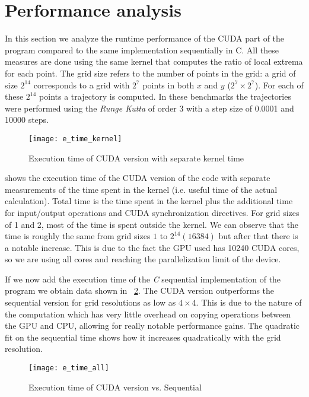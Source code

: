 
\section{Performance analysis}
\label{sec:performance}


In this section we analyze the runtime performance of the CUDA part of
the program compared to the same implementation sequentially in C. All
these measures are done using the same kernel that computes the ratio
of local extrema for each point. The grid size refers to the number of
points in the grid: a grid of size $2^14$ corresponds to a
grid with $2^7$ points in both $x$ and $y$ ($2^7 \times 2^7$). For each of these
$2^14$ points a trajectory is computed. In these benchmarks the trajectories were
performed using the \emph{Runge Kutta} of order 3 with a step size of 0.0001 and
10000 steps.


\begin{figure}[H]
    \centering
    \texttt{[image: e\_time\_kernel]}
    \caption{Execution time of CUDA version with separate kernel time
    }%
    \label{fig:time_overhead}
\end{figure}

 shows the execution time of the CUDA version of the code with separate measurements of the time spent in the kernel (i.e. useful time of the actual calculation). Total time is the time spent in the kernel plus the additional time for input/output operations and CUDA synchronization directives. For grid sizes of 1 and 2, most of the time is spent outside the kernel. We can observe that the time is roughly the same from grid sizes $1$ to $2^14 (16384)$ but after that there is a notable increase. This is due to the fact the GPU used has 10240 CUDA cores, so
we are using all cores and reaching the parallelization limit of the device.

If we now add the execution time of the \emph{C} sequential implementation of the
program we obtain data shown in ~\cref{fig:time_cuda}. The CUDA version outperforms the sequential version for grid resolutions as low as $4\times4$. This is due to the nature of the computation which has very little overhead on copying operations between the GPU and CPU, allowing for really notable performance gains. The quadratic fit on the sequential time shows how it increases quadratically with the grid resolution.

\begin{figure}[H]
    \centering
    \texttt{[image: e\_time\_all]}
    \caption{Execution time of CUDA version vs. Sequential}%
    \label{fig:time_cuda}
\end{figure}

